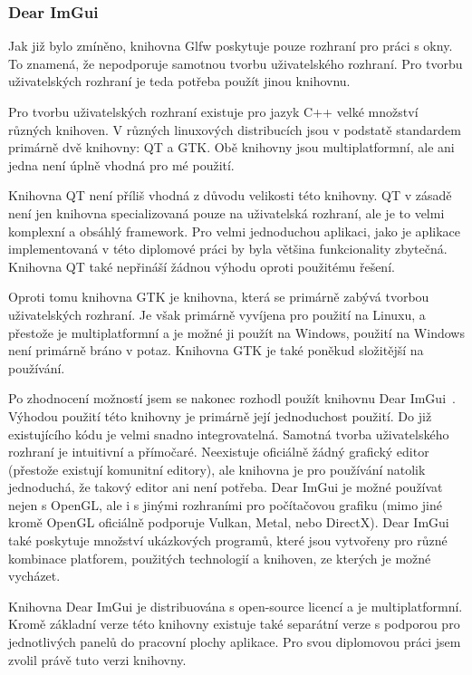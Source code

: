 \documentclass[czech,master]{diploma}
\begin{document}
\subsubsection*{Dear ImGui}
Jak již bylo zmíněno, knihovna Glfw poskytuje pouze rozhraní pro práci s okny. To znamená, že nepodporuje samotnou tvorbu uživatelského rozhraní. Pro tvorbu uživatelských rozhraní je teda potřeba použít jinou knihovnu.\par
Pro tvorbu uživatelských rozhraní existuje pro jazyk C++ velké množství různých knihoven. V různých linuxových distribucích jsou v podstatě standardem primárně dvě knihovny: QT a GTK\@. Obě knihovny jsou multiplatformní, ale ani jedna není úplně vhodná pro mé použití.\par Knihovna QT není příliš vhodná z důvodu velikosti této knihovny. QT v zásadě není jen knihovna specializovaná pouze na uživatelská rozhraní, ale je to velmi komplexní a obsáhlý framework. Pro velmi jednoduchou aplikaci, jako je aplikace implementovaná v této diplomové práci by byla většina funkcionality zbytečná. Knihovna QT také nepřináší žádnou výhodu oproti použitému řešení.\par
Oproti tomu knihovna GTK je knihovna, která se primárně zabývá tvorbou uživatelských rozhraní. Je však primárně vyvíjena pro použití na Linuxu, a přestože je multiplatformní a je možné ji použít na Windows, použití na Windows není primárně bráno v potaz. Knihovna GTK je také poněkud složitější na používání.\par
Po zhodnocení možností jsem se nakonec rozhodl použít knihovnu Dear ImGui~\cite{sourceImgui}. Výhodou použití této knihovny je primárně její jednoduchost použití. Do již existujícího kódu je velmi snadno integrovatelná. Samotná tvorba uživatelského rozhraní je intuitivní a přímočaré. Neexistuje oficiálně žádný grafický editor (přestože existují komunitní editory), ale knihovna je pro používání natolik jednoduchá, že takový editor ani není potřeba. Dear ImGui je možné používat nejen s OpenGL, ale i s jinými rozhraními pro počítačovou grafiku (mimo jiné kromě OpenGL oficiálně podporuje Vulkan, Metal, nebo DirectX). Dear ImGui také poskytuje množství ukázkových programů, které jsou vytvořeny pro různé kombinace platforem, použitých technologií a knihoven, ze kterých je možné vycházet.\par
Knihovna Dear ImGui je distribuována s open-source licencí a je multiplatformní. Kromě základní verze této knihovny existuje také separátní verze s podporou pro  jednotlivých panelů do pracovní plochy aplikace. Pro svou diplomovou práci jsem zvolil právě tuto verzi knihovny.
\end{document}
